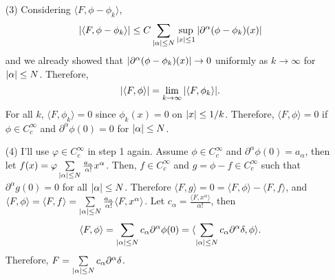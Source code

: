 \documentclass{article}
\begin{document}
\begin{enumerate}
\begin{proof}
pf of hint: The Taylor series of $\phi$ about $0$ would be
\begin{equation*}
\phi(x)=\sum_{\abs{\beta}\leq N+1} \frac{\partial^\beta \phi(0)}{\beta!} x^\beta + r(x)
\end{equation*}
such that $r(x)$ is differentiable and $\lim\limits_{x\rightarrow 0}\frac{r(x)}{\abs{x}^{N+1}}=0$. Since we only interested in $\abs{x}\leq 1$, $\partial^\beta\phi$ is bounded for all $\abs{\beta}\leq N+1$ and and $\frac{r(x)}{x^{N+1}}$ is bounded in $\abs{x}\leq 1$. As $\partial^\beta \phi(0)=0$ for $\abs{\beta}\leq N$, we can get
\begin{equation*}
\abs{\phi(x)}\leq \left(C+\frac{r(x)}{\abs{x}^{N+1}}\right) \abs{x}^{N+1}\leq C' \abs{x}^{N+1}.
\end{equation*}
for some $0<C, C'<\infty$. By the same reason, we can get
\begin{equation*}
\abs{\partial^\alpha \phi(x)}\leq C\abs{x}^{N+1-\abs{\alpha}}
\end{equation*}
for $\abs{\alpha}\leq N$.
\end{proof}
\item[(3)] Considering $\langle F,\phi-\phi_k\rangle$,
\begin{equation*}
\begin{split}
\abs{\langle F,\phi-\phi_k\rangle}\leq C\sum\limits_{\abs{\alpha}\leq N}\sup\limits_{\abs{x}\leq 1}\abs{\partial^\alpha(\phi-\phi_k)(x)}
\end{split}
\end{equation*}
and we already showed that $\abs{\partial^\alpha(\phi-\phi_k)(x)}\rightarrow 0$ uniformly as $k\rightarrow\infty$ for $\abs{\alpha}\leq N$. Therefore,
\begin{equation*}
\abs{\langle F,\phi\rangle}=\lim\limits_{k\rightarrow \infty} \abs{\langle F,\phi_k\rangle}.
\end{equation*}
For all $k$, $\langle F, \phi_k\rangle=0$ since $\phi_k(x)=0$ on $\abs{x}\leq 1/k$. Therefore, $\langle F, \phi \rangle=0$ if $\phi\in C_c^\infty$ and $\partial^\alpha\phi(0)=0$ for $\abs{\alpha}\leq N$.
\item[(4)] I'll use $\varphi\in C_c^\infty$ in step 1 again. Assume $\phi\in C_c^\infty$ and $\partial^\alpha \phi(0)=a_\alpha$, then let $f(x)=\varphi\sum\limits_{\abs{\alpha}\leq N} \frac{a_\alpha}{\alpha!} x^\alpha $. Then, $f\in C_c^\infty$ and $g=\phi-f\in C_c^\infty$ such that $\partial^\alpha g(0)=0$ for all $\abs{\alpha}\leq N$. Therefore $\langle F, g\rangle=0=\langle F, \phi\rangle-\langle F, f\rangle$, and $\langle F, \phi\rangle=\langle F, f\rangle=\sum\limits_{\abs{\alpha}\leq N} \frac{a_\alpha}{\alpha!}\langle F, x^\alpha\rangle$. Let $c_\alpha=\frac{\langle F, x^\alpha\rangle}{\alpha!}$, then
\begin{equation*}
\langle F, \phi\rangle=\sum\limits_{\abs{\alpha}\leq N}c_\alpha \partial^\alpha \phi(0)=\langle \sum\limits_{\abs{\alpha}\leq N} c_\alpha \partial^\alpha \delta, \phi\rangle.
\end{equation*}
Therefore, $F=\sum\limits_{\abs{\alpha}\leq N} c_\alpha \partial^\alpha \delta$.
\end{enumerate}
\end{document}

